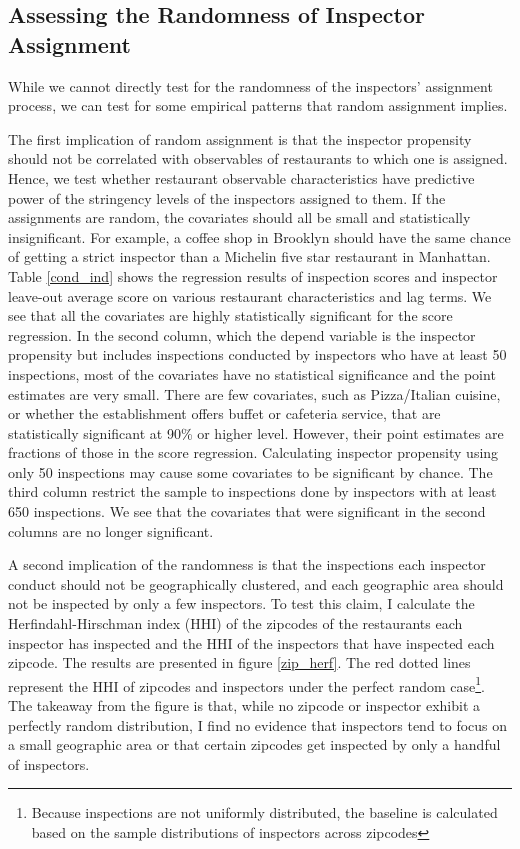 \documentclass[11pt]{article}
\begin{document}
\subsection{Assessing the Randomness of Inspector Assignment}

While we cannot directly test for the randomness of the inspectors' assignment process, we can test for some empirical patterns that random assignment implies.  

The first implication of random assignment is that the inspector propensity should not be correlated with observables of restaurants to which one is assigned. Hence, we test whether restaurant observable characteristics have predictive power of the stringency levels of the inspectors assigned to them. If the assignments are random, the covariates should all be small and statistically insignificant. For example, a coffee shop in Brooklyn should have the same chance of getting a strict inspector than a Michelin five star restaurant in Manhattan. Table \ref{cond_ind} shows the regression results of inspection scores and inspector leave-out average score on various restaurant characteristics and lag terms. We see that all the covariates are highly statistically significant for the score regression. In the second column, which the depend variable is the inspector propensity but includes inspections conducted by inspectors who have at least 50 inspections, most of the covariates have no statistical significance and the point estimates are very small. There are few covariates, such as Pizza/Italian cuisine, or whether the establishment offers buffet or cafeteria service, that are statistically significant at 90\% or higher level. However, their point estimates are fractions of those in the score regression. Calculating inspector propensity using only 50 inspections may cause some covariates to be significant by chance. The third column restrict the sample to inspections done by inspectors with at least 650 inspections. We see that the covariates that were significant in the second columns are no longer significant. 

A second implication of the randomness is that the inspections each inspector conduct should not be geographically clustered, and each geographic area should not be inspected by only a few inspectors. To test this claim, I calculate the Herfindahl-Hirschman index (HHI) of the zipcodes of the restaurants each inspector has inspected and the HHI of the inspectors that have inspected each zipcode. The results are presented in figure \ref{zip_herf}. The red dotted lines represent the HHI of zipcodes and inspectors under the perfect random case\footnote{Because inspections are not uniformly distributed, the baseline is calculated based on the sample distributions of inspectors across zipcodes}. The takeaway from the figure is that, while no zipcode or inspector exhibit a perfectly random distribution, I find no evidence that inspectors tend to focus on a small geographic area or that certain zipcodes get inspected by only a handful of inspectors. 
\end{document}
